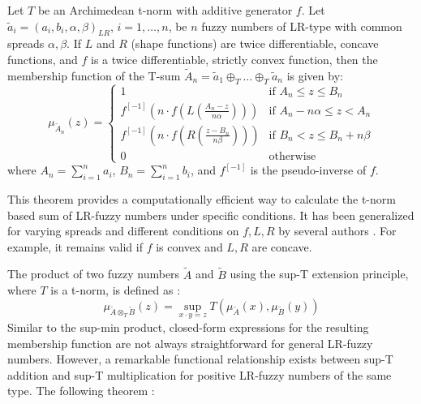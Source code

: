 \begin{theorem}
\label{thm:tnorm_addition_lr}
Let $T$ be an Archimedean t-norm with additive generator $f$. Let $\tilde{a}_i = (a_i, b_i, \alpha, \beta)_{LR}$, $i=1, \dots, n$, be $n$ fuzzy numbers of LR-type with common spreads $\alpha, \beta$. If $L$ and $R$ (shape functions) are twice differentiable, concave functions, and $f$ is a twice differentiable, strictly convex function, then the membership function of the T-sum $\tilde{A}_n = \tilde{a}_1 \oplus_T \dots \oplus_T \tilde{a}_n$ is given by:
\begin{equation}
\mu_{\tilde{A}_n}(z) =
\begin{cases}
1 & \text{if } A_n \le z \le B_n \\
f^{[-1]}\left( n \cdot f\left(L\left(\frac{A_n-z}{n\alpha}\right)\right) \right) & \text{if } A_n - n\alpha \le z < A_n \\
f^{[-1]}\left( n \cdot f\left(R\left(\frac{z-B_n}{n\beta}\right)\right) \right) & \text{if } B_n < z \le B_n + n\beta \\
0 & \text{otherwise}
\end{cases}
\end{equation}
where $A_n = \sum_{i=1}^n a_i$, $B_n = \sum_{i=1}^n b_i$, and $f^{[-1]}$ is the pseudo-inverse of $f$.
\end{theorem}
\begin{remark}
This theorem provides a computationally efficient way to calculate the t-norm based sum of LR-fuzzy numbers under specific conditions. It has been generalized for varying spreads and different conditions on $f, L, R$ by several authors \cite[p.29]{FULLER2}. For example, it remains valid if $f$ is convex and $L,R$ are concave.
\end{remark}
The product of two fuzzy numbers $\tilde{A}$ and $\tilde{B}$ using the sup-T extension principle, where $T$ is a t-norm, is defined as \cite[p.20]{FULLER2}:
\begin{equation}
\mu_{\tilde{A} \otimes_T \tilde{B}}(z) = \sup_{x \cdot y = z} T(\mu_{\tilde{A}}(x), \mu_{\tilde{B}}(y))
\end{equation}
Similar to the sup-min product, closed-form expressions for the resulting membership function are not always straightforward for general LR-fuzzy numbers. However, a remarkable functional relationship exists between sup-T addition and sup-T multiplication for positive LR-fuzzy numbers of the same type. The following theorem \cite[Thm. 1.8.1]{FULLER2}:

